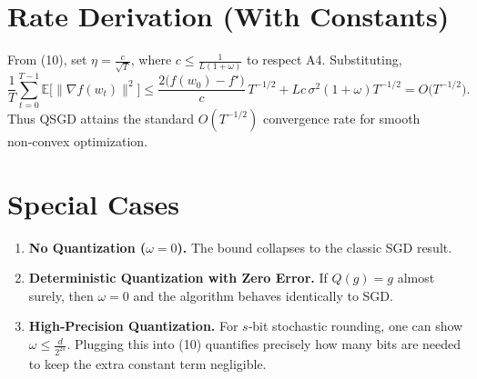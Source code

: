 \documentclass{article}
\begin{document}
\section*{Rate Derivation (With Constants)}
From (10), set $\eta = \frac{c}{\sqrt{T}}$, where $c\le \frac{1}{L(1+\omega)}$ to respect A4. Substituting,
\[
\frac{1}{T}\sum_{t=0}^{T-1}\mathbb{E}\!\big[\|\nabla f(w_t)\|^2\big]
\le
\frac{2\big(f(w_0)-f^\star\big)}{c}\,T^{-1/2}
   + Lc\,\sigma^2(1+\omega)T^{-1/2}
= O\!\big(T^{-1/2}\big).
\]
Thus QSGD attains the standard $O(T^{-1/2})$ convergence rate for smooth non‑convex optimization.

\section*{Special Cases}
\begin{enumerate}[label={S\arabic*}]
    \item \textbf{No Quantization ($\omega=0$).} The bound collapses to the classic SGD result.
    \item \textbf{Deterministic Quantization with Zero Error.} If $Q(g)=g$ almost surely, then $\omega=0$ and the algorithm behaves identically to SGD.
    \item \textbf{High‑Precision Quantization.} For $s$‑bit stochastic rounding, one can show $\omega\le \frac{d}{2^{2s}}$. Plugging this into (10) quantifies precisely how many bits are needed to keep the extra constant term negligible.
\end{enumerate}
\end{document}
